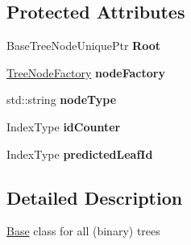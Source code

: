 \subsection*{Protected Attributes}
\begin{DoxyCompactItemize}
\item 
\hypertarget{classffactory_1_1_base_tree_a8a5d418c6bddeee0a4495dadaf6b8136}{Base\-Tree\-Node\-Unique\-Ptr {\bfseries Root}}\label{classffactory_1_1_base_tree_a8a5d418c6bddeee0a4495dadaf6b8136}

\item 
\hypertarget{classffactory_1_1_base_tree_af31f1583719f797c6c8bbf1c1c82050b}{\hyperlink{classffactory_1_1_tree_node_factory}{Tree\-Node\-Factory} {\bfseries node\-Factory}}\label{classffactory_1_1_base_tree_af31f1583719f797c6c8bbf1c1c82050b}

\item 
\hypertarget{classffactory_1_1_base_tree_a6d076f850764b5707baa35cdc4c0a8ca}{std\-::string {\bfseries node\-Type}}\label{classffactory_1_1_base_tree_a6d076f850764b5707baa35cdc4c0a8ca}

\item 
\hypertarget{classffactory_1_1_base_tree_a505141e97bcfffde60679169405937e3}{Index\-Type {\bfseries id\-Counter}}\label{classffactory_1_1_base_tree_a505141e97bcfffde60679169405937e3}

\item 
\hypertarget{classffactory_1_1_base_tree_a8678b16b0abe5ea9106c72ed5310e202}{Index\-Type {\bfseries predicted\-Leaf\-Id}}\label{classffactory_1_1_base_tree_a8678b16b0abe5ea9106c72ed5310e202}

\end{DoxyCompactItemize}


\subsection{Detailed Description}
\hyperlink{classffactory_1_1_base}{Base} class for all (binary) trees 

